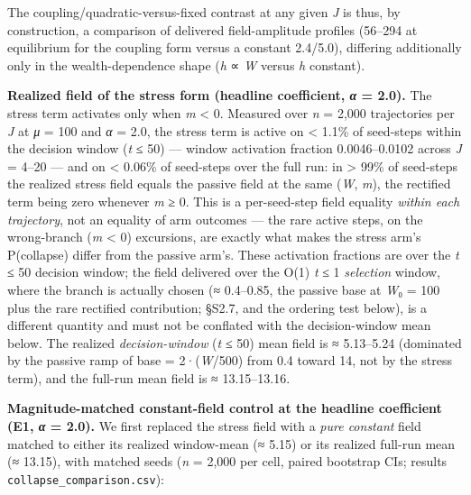 \documentclass[11pt,letterpaper]{article}
\begin{document}
The coupling/quadratic-versus-fixed contrast at any given \emph{J} is thus, by construction, a comparison of delivered field-amplitude profiles (56--294 at equilibrium for the coupling form versus a constant 2.4/5.0), differing additionally only in the wealth-dependence shape (\emph{h} ∝ \emph{W} versus \emph{h} constant).

\textbf{Realized field of the stress form (headline coefficient, \emph{α} = 2.0).} The stress term activates only when \emph{m} \textless{} 0. Measured over \emph{n} = 2,000 trajectories per \emph{J} at \emph{μ} = 100 and \emph{α} = 2.0, the stress term is active on \textless{} 1.1\% of seed-steps within the decision window (\emph{t} ≤ 50) --- window activation fraction 0.0046--0.0102 across \emph{J} = 4--20 --- and on \textless{} 0.06\% of seed-steps over the full run: in \textgreater{} 99\% of seed-steps the realized stress field equals the passive field at the same (\emph{W}, \emph{m}), the rectified term being zero whenever \emph{m} ≥ 0. This is a per-seed-step field equality \emph{within each trajectory}, not an equality of arm outcomes --- the rare active steps, on the wrong-branch (\emph{m} \textless{} 0) excursions, are exactly what makes the stress arm's P(collapse) differ from the passive arm's. These activation fractions are over the \emph{t} ≤ 50 decision window; the field delivered over the O(1) \emph{t} ≤ 1 \emph{selection} window, where the branch is actually chosen (≈ 0.4--0.85, the passive base at \emph{W}₀ = 100 plus the rare rectified contribution; §S2.7, and the ordering test below), is a different quantity and must not be conflated with the decision-window mean below. The realized \emph{decision-window} (\emph{t} ≤ 50) mean field is ≈ 5.13--5.24 (dominated by the passive ramp of base = 2·(\emph{W}/500) from 0.4 toward 14, not by the stress term), and the full-run mean field is ≈ 13.15--13.16.

\textbf{Magnitude-matched constant-field control at the headline coefficient (E1, \emph{α} = 2.0).} We first replaced the stress field with a \emph{pure constant} field matched to either its realized window-mean (≈ 5.15) or its realized full-run mean (≈ 13.15), with matched seeds (\emph{n} = 2,000 per cell, paired bootstrap CIs; results \texttt{collapse\_comparison.csv}):
\end{document}
